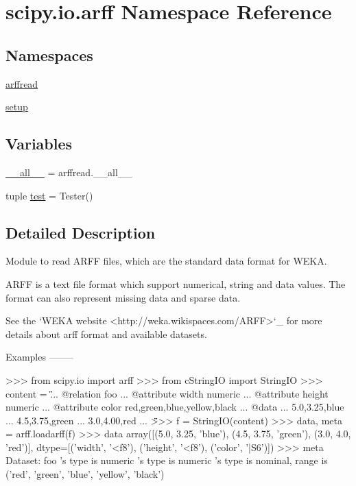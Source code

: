 \hypertarget{namespacescipy_1_1io_1_1arff}{}\section{scipy.\+io.\+arff Namespace Reference}
\label{namespacescipy_1_1io_1_1arff}
\subsection*{Namespaces}
\begin{DoxyCompactItemize}
\item 
 \hyperlink{namespacescipy_1_1io_1_1arff_1_1arffread}{arffread}
\item 
 \hyperlink{namespacescipy_1_1io_1_1arff_1_1setup}{setup}
\end{DoxyCompactItemize}
\subsection*{Variables}
\begin{DoxyCompactItemize}
\item 
\hyperlink{namespacescipy_1_1io_1_1arff_a12e41f7d3b05e6f24ed3ea53adef2af7}{\+\_\+\+\_\+all\+\_\+\+\_\+} = arffread.\+\_\+\+\_\+all\+\_\+\+\_\+
\item 
tuple \hyperlink{namespacescipy_1_1io_1_1arff_ac902c6dc61d43824db7dda4e6a6305ee}{test} = Tester()
\end{DoxyCompactItemize}


\subsection{Detailed Description}
\begin{DoxyVerb}Module to read ARFF files, which are the standard data format for WEKA.

ARFF is a text file format which support numerical, string and data values.
The format can also represent missing data and sparse data.

See the `WEKA website
<http://weka.wikispaces.com/ARFF>`_
for more details about arff format and available datasets.

Examples
--------

>>> from scipy.io import arff
>>> from cStringIO import StringIO
>>> content = \"\"\"
... @relation foo
... @attribute width  numeric
... @attribute height numeric
... @attribute color  {red,green,blue,yellow,black}
... @data
... 5.0,3.25,blue
... 4.5,3.75,green
... 3.0,4.00,red
... \"\"\"
>>> f = StringIO(content)
>>> data, meta = arff.loadarff(f)
>>> data
array([(5.0, 3.25, 'blue'), (4.5, 3.75, 'green'), (3.0, 4.0, 'red')],
      dtype=[('width', '<f8'), ('height', '<f8'), ('color', '|S6')])
>>> meta
Dataset: foo
\twidth's type is numeric
\theight's type is numeric
\tcolor's type is nominal, range is ('red', 'green', 'blue', 'yellow', 'black')\end{DoxyVerb}
 

